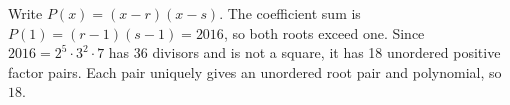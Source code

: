 Write $ P(x)=(x-r)(x-s)$. The coefficient sum is $ P(1)=(r-1)(s-1)=2016 $, so both roots exceed one. Since $ 2016=2^5\cdot3^2\cdot7 $ has 36 divisors and is not a square, it has 18 unordered positive factor pairs. Each pair uniquely gives an unordered root pair and polynomial, so $\boxed{18}$.
